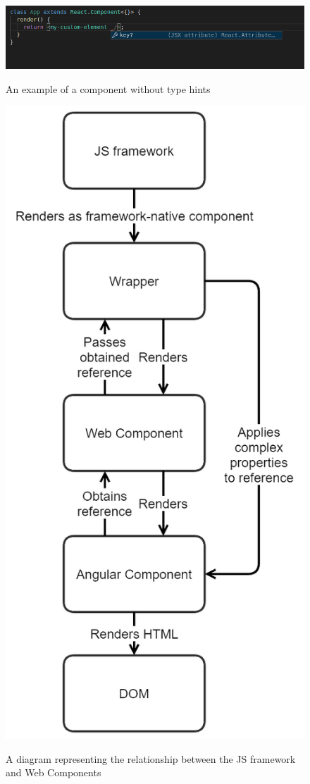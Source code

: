 \begin{figure}[h]
  \caption{An example of a component without type hints}
  \includegraphics[width=\columnwidth]{figures/background/no-hinting.png}
  \label{fig:bg:no-hinting}
  \centering
\end{figure}

\begin{figure}[h]
  \caption{A diagram representing the relationship between the JS framework and Web Components}
  \includegraphics[scale=0.3]{figures/background/wrapper-diagram.png}
  \label{fig:bg:wrapper-diagram}
  \centering
\end{figure}


